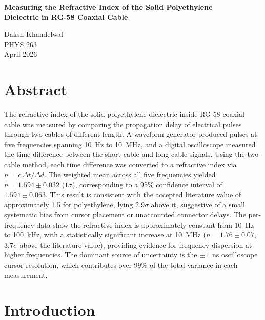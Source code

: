 \documentclass[12pt]{article}
\begin{document}
\begin{center}
{\Large\bfseries Measuring the Refractive Index of the Solid Polyethylene\\[4pt] Dielectric in RG-58 Coaxial Cable}

\vspace{16pt}
Daksh Khandelwal\\[4pt]
PHYS 263\\[4pt]
April 2026
\end{center}

\vspace{12pt}

\section*{Abstract}

The refractive index of the solid polyethylene dielectric inside RG-58 coaxial cable was measured by comparing the propagation delay of electrical pulses through two cables of different length. A waveform generator produced pulses at five frequencies spanning 10~Hz to 10~MHz, and a digital oscilloscope measured the time difference between the short-cable and long-cable signals. Using the two-cable method, each time difference was converted to a refractive index via $n = c\,\Delta t / \Delta d$. The weighted mean across all five frequencies yielded $n = 1.594 \pm 0.032$ ($1\sigma$), corresponding to a 95\% confidence interval of $1.594 \pm 0.063$. This result is consistent with the accepted literature value of approximately 1.5 for polyethylene, lying $2.9\sigma$ above it, suggestive of a small systematic bias from cursor placement or unaccounted connector delays. The per-frequency data show the refractive index is approximately constant from 10~Hz to 100~kHz, with a statistically significant increase at 10~MHz ($n = 1.76 \pm 0.07$, $3.7\sigma$ above the literature value), providing evidence for frequency dispersion at higher frequencies. The dominant source of uncertainty is the $\pm 1$~ns oscilloscope cursor resolution, which contributes over 99\% of the total variance in each measurement.

\section{Introduction}
\end{document}
